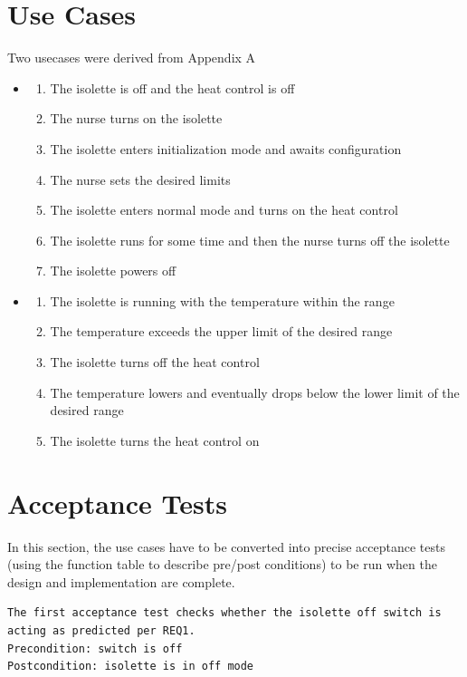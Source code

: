 \documentclass[fontsize=12pt,paper=letter,twoside]{scrartcl}
\begin{document}
\section{Use Cases}
Two usecases were derived from \cite{REMH} Appendix A
\begin{itemize}
    \item \begin{enumerate}
        \item The isolette is off and the heat control is off
        \item The nurse turns on the isolette
        \item The isolette enters initialization mode and awaits configuration
        \item The nurse sets the desired limits
        \item The isolette enters normal mode and turns on the heat control
        \item The isolette runs for some time and then the nurse turns off the isolette
        \item The isolette powers off
    \end{enumerate}

    \item \begin{enumerate}
        \item The isolette is running with the temperature within the range
        \item The temperature exceeds the upper limit of the desired range
        \item The isolette turns off the heat control
        \item The temperature lowers and eventually drops below the lower limit of the desired range
        \item The isolette turns the heat control on
    \end{enumerate}
\end{itemize}
\section{Acceptance Tests}
In this section, the use cases have to be converted into precise acceptance tests (using the function table to describe pre/post conditions) to be run when the design and implementation are complete.


\begin{lstlisting}
The first acceptance test checks whether the isolette off switch is acting as predicted per REQ1.
Precondition: switch is off
Postcondition: isolette is in off mode
\end{lstlisting}
\end{document}
